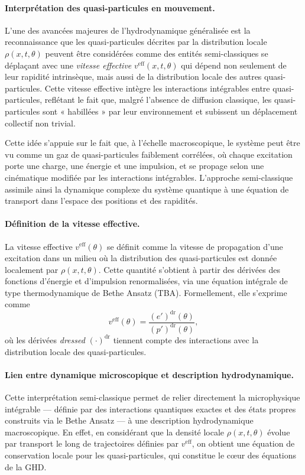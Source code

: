 \paragraph{Interprétation des quasi-particules en mouvement.}
L’une des avancées majeures de l’hydrodynamique généralisée est la reconnaissance que les quasi-particules décrites par la distribution locale $\rho(x,t,\theta)$ peuvent être considérées comme des entités semi-classiques se déplaçant avec une \emph{vitesse effective} $v^{\mathrm{eff}}(x,t,\theta)$ qui dépend non seulement de leur rapidité intrinsèque, mais aussi de la distribution locale des autres quasi-particules. Cette vitesse effective intègre les interactions intégrables entre quasi-particules, reflétant le fait que, malgré l’absence de diffusion classique, les quasi-particules sont « habillées » par leur environnement et subissent un déplacement collectif non trivial.

Cette idée s’appuie sur le fait que, à l’échelle macroscopique, le système peut être vu comme un gaz de quasi-particules faiblement corrélées, où chaque excitation porte une charge, une énergie et une impulsion, et se propage selon une cinématique modifiée par les interactions intégrables. L’approche semi-classique assimile ainsi la dynamique complexe du système quantique à une équation de transport dans l’espace des positions et des rapidités.

\paragraph{Définition de la vitesse effective.}
La vitesse effective $v^{\mathrm{eff}}(\theta)$ se définit comme la vitesse de propagation d’une excitation dans un milieu où la distribution des quasi-particules est donnée localement par $\rho(x,t,\theta)$. Cette quantité s’obtient à partir des dérivées des fonctions d’énergie et d’impulsion renormalisées, via une équation intégrale de type thermodynamique de Bethe Ansatz (TBA). Formellement, elle s’exprime comme
\[
v^{\mathrm{eff}}(\theta) = \frac{(e')^{\mathrm{dr}}(\theta)}{(p')^{\mathrm{dr}}(\theta)},
\]
où les dérivées \emph{dressed} $(\cdot)^{\mathrm{dr}}$ tiennent compte des interactions avec la distribution locale des quasi-particules.

\paragraph{Lien entre dynamique microscopique et description hydrodynamique.}
Cette interprétation semi-classique permet de relier directement la microphysique intégrable — définie par des interactions quantiques exactes et des états propres construits via le Bethe Ansatz — à une description hydrodynamique macroscopique. En effet, en considérant que la densité locale $\rho(x,t,\theta)$ évolue par transport le long de trajectoires définies par $v^{\mathrm{eff}}$, on obtient une équation de conservation locale pour les quasi-particules, qui constitue le cœur des équations de la GHD.

